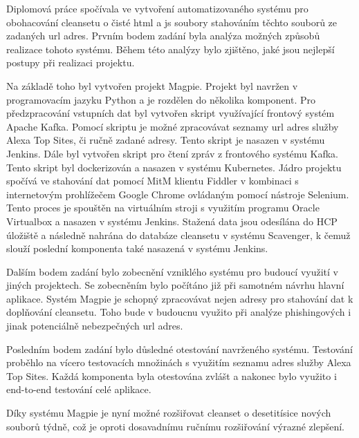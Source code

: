 \documentclass[thesis=M,czech,hidelinks]{FITthesis}[2013/05/06]
\begin{document}
\begin{conclusion}

Diplomová práce spočívala ve vytvoření automatizovaného systému pro obohacování cleansetu o čisté html a js soubory stahováním těchto souborů ze zadaných url adres. Prvním bodem zadání byla analýza možných způsobů realizace tohoto systému. Během této analýzy bylo zjištěno, jaké jsou nejlepší postupy při realizaci projektu. 

Na základě toho byl vytvořen projekt Magpie. Projekt byl navržen v programovacím jazyku Python a je rozdělen do několika komponent. Pro předzpracování vstupních dat byl vytvořen skript využívající frontový systém Apache Kafka. Pomocí skriptu je možné zpracovávat seznamy url adres služby Alexa Top Sites, či ručně zadané adresy. Tento skript je nasazen v systému Jenkins. Dále byl vytvořen skript pro čtení zpráv z frontového systému Kafka. Tento skript byl dockerizován a nasazen v systému Kubernetes. Jádro projektu spočívá ve stahování dat pomocí MitM klientu Fiddler v kombinaci s internetovým prohlížečem Google Chrome ovládaným pomocí nástroje Selenium. Tento proces je spouštěn na virtuálním stroji s využitím programu Oracle Virtualbox a nasazen v systému Jenkins. Stažená data jsou odesílána do HCP úložiště a následně nahrána do databáze cleansetu v systému Scavenger, k čemuž slouží poslední komponenta také nasazená v systému Jenkins.

Dalším bodem zadání bylo zobecnění vzniklého systému pro budoucí využití v jiných projektech. Se zobecněním bylo počítáno již při samotném návrhu hlavní aplikace. Systém Magpie je schopný zpracovávat nejen adresy pro stahování dat k doplňování cleansetu. Toho bude v budoucnu využito při analýze phishingových i jinak potenciálně nebezpečných url adres.

Posledním bodem zadání bylo důsledné otestování navrženého systému. Testování proběhlo na vícero testovacích množinách s využitím seznamu adres služby Alexa Top Sites. Každá komponenta byla otestována zvlášt a nakonec bylo využito i end-to-end testování celé aplikace.

Díky systému Magpie je nyní možné rozšiřovat cleanset o desetitísice nových souborů týdně, což je oproti dosavadnímu ručnímu rozšiřování výrazné zlepšení. 







\end{conclusion}
\end{document}
